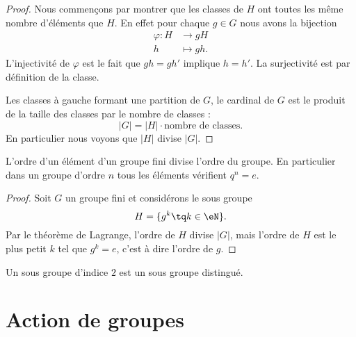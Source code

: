 \begin{proof}
    Nous commençons par montrer que les classes de \( H\) ont toutes les même nombre d'éléments que \( H\). En effet pour chaque \( g\in G\) nous avons la bijection
    \begin{equation}
        \begin{aligned}
            \varphi\colon H&\to gH \\
            h&\mapsto gh. 
        \end{aligned}
    \end{equation}
    L'injectivité de \( \varphi\) est le fait que \( gh=gh'\) implique \( h=h'\). La surjectivité est par définition de la classe. 

    Les classes à gauche formant une partition de \( G\), le cardinal de \( G\) est le produit de la taille des classes par le nombre de classes :
    \begin{equation}
        | G |=| H |\cdot\text{nombre de classes}.
    \end{equation}
    En particulier nous voyons que \( | H |\) divise \( | G |\).
\end{proof}

\begin{corollary}       \label{CorpZItFX}
    L'ordre d'un élément d'un groupe fini divise l'ordre du groupe. En particulier dans un groupe d'ordre \( n\) tous les éléments vérifient \( q^n=e\).
\end{corollary}

\begin{proof}
    Soit \( G\) un groupe fini et considérons le sous groupe
    \begin{equation}
        H=\{ g^k\tq k\in\eN \}.
    \end{equation}
    Par le théorème de Lagrange, l'ordre de \( H\) divise \( | G |\), mais l'ordre de \( H\) est le plus petit \( k\) tel que \( g^k=e\), c'est à dire l'ordre de \( g\).
\end{proof}

\begin{lemma}    \label{LemSkIOOG}
    Un sous groupe d'indice \( 2\) est un sous groupe distingué.
\end{lemma}

\section{Action de groupes}

